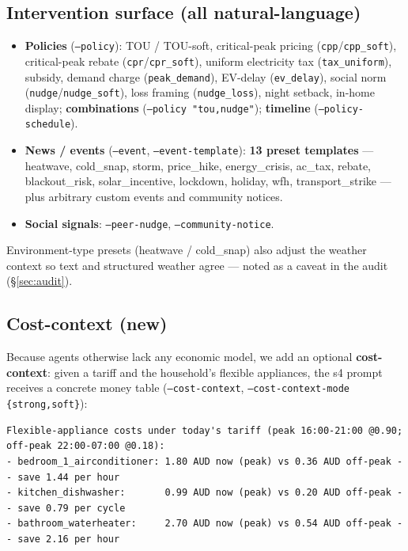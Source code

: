 \documentclass[11pt]{article}
\begin{document}
\subsection{Intervention surface (all natural-language)}
\begin{itemize}
\item \textbf{Policies} (\texttt{--policy}): TOU / TOU-soft, critical-peak pricing
(\texttt{cpp}/\texttt{cpp\_soft}), critical-peak rebate (\texttt{cpr}/\texttt{cpr\_soft}), uniform
electricity tax (\texttt{tax\_uniform}), subsidy, demand charge (\texttt{peak\_demand}), EV-delay
(\texttt{ev\_delay}), social norm (\texttt{nudge}/\texttt{nudge\_soft}), loss framing
(\texttt{nudge\_loss}), night setback, in-home display; \textbf{combinations}
(\texttt{--policy "tou,nudge"}); \textbf{timeline} (\texttt{--policy-schedule}).
\item \textbf{News / events} (\texttt{--event}, \texttt{--event-template}): \textbf{13 preset templates}
--- heatwave, cold\_snap, storm, price\_hike, energy\_crisis, ac\_tax, rebate, blackout\_risk,
solar\_incentive, lockdown, holiday, wfh, transport\_strike --- plus arbitrary custom events and community
notices.
\item \textbf{Social signals}: \texttt{--peer-nudge}, \texttt{--community-notice}.
\end{itemize}
Environment-type presets (heatwave / cold\_snap) also adjust the weather context so text and structured
weather agree --- noted as a caveat in the audit (\S\ref{sec:audit}).

\subsection{Cost-context (new)}
Because agents otherwise lack any economic model, we add an optional \textbf{cost-context}: given a tariff
and the household's flexible appliances, the s4 prompt receives a concrete money table
(\texttt{--cost-context}, \texttt{--cost-context-mode \{strong,soft\}}):

\begin{verbatim}
Flexible-appliance costs under today's tariff (peak 16:00-21:00 @0.90; off-peak 22:00-07:00 @0.18):
- bedroom_1_airconditioner: 1.80 AUD now (peak) vs 0.36 AUD off-peak -- save 1.44 per hour
- kitchen_dishwasher:       0.99 AUD now (peak) vs 0.20 AUD off-peak -- save 0.79 per cycle
- bathroom_waterheater:     2.70 AUD now (peak) vs 0.54 AUD off-peak -- save 2.16 per hour
\end{verbatim}
\end{document}
